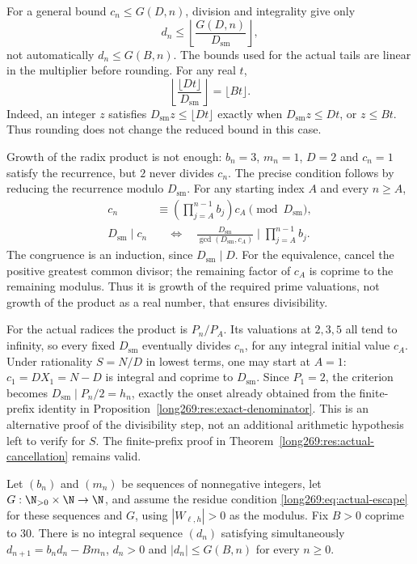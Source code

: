 For a general bound $c_n\le G(D,n)$, division and integrality give only
\[
 d_n\le\left\lfloor\frac{G(D,n)}{D_{\mathrm{sm}}}\right\rfloor,
\]
not automatically $d_n\le G(B,n)$.  The bounds used for the actual tails
are linear in the multiplier before rounding.  For any real $t$,
\[
 \left\lfloor\frac{\lfloor Dt\rfloor}{D_{\mathrm{sm}}}\right\rfloor
 =\lfloor Bt\rfloor.
\]
Indeed, an integer $z$ satisfies $D_{\mathrm{sm}}z\le\lfloor Dt\rfloor$
exactly when $D_{\mathrm{sm}}z\le Dt$, or $z\le Bt$.
Thus rounding does not change the reduced bound in this case.

Growth of the radix product is not enough: $b_n=3$, $m_n=1$, $D=2$
and $c_n=1$ satisfy the recurrence, but $2$ never divides $c_n$.
The precise condition follows by reducing the recurrence modulo
$D_{\mathrm{sm}}$.  For any starting index $A$ and every $n\ge A$,
\[
 \begin{aligned}
 c_n&\equiv\left(\prod_{j=A}^{n-1}b_j\right)c_A
       \pmod{D_{\mathrm{sm}}},\\
 D_{\mathrm{sm}}\mid c_n
 &\quad\Longleftrightarrow\quad
 \frac{D_{\mathrm{sm}}}{\gcd(D_{\mathrm{sm}},c_A)}
       \mid\prod_{j=A}^{n-1}b_j.
 \end{aligned}
\]
The congruence is an induction, since $D_{\mathrm{sm}}\mid D$.
For the equivalence, cancel the positive greatest common divisor;
the remaining factor of $c_A$ is coprime to the remaining modulus.
Thus it is growth of the required prime valuations, not growth of the
product as a real number, that ensures divisibility.

For the actual radices the product is $P_n/P_A$.  Its valuations at
$2,3,5$ all tend to infinity, so every fixed $D_{\mathrm{sm}}$ eventually
divides $c_n$, for any integral initial value $c_A$.  Under rationality
$S=N/D$ in lowest terms, one may start at $A=1$:
$c_1=DX_1=N-D$ is integral and coprime to $D_{\mathrm{sm}}$.
Since $P_1=2$, the criterion becomes
$D_{\mathrm{sm}}\mid P_n/2=h_n$, exactly the onset already obtained
from the finite-prefix identity in Proposition~\ref{long269:res:exact-denominator}.
This is an alternative proof of the divisibility step, not an additional
arithmetic hypothesis left to verify for $S$.  The finite-prefix proof
in Theorem~\ref{long269:res:actual-cancellation} remains valid.

\begin{proposition}
\label{long269:long:windowconsumer}
Let $(b_n)$ and $(m_n)$ be sequences of nonnegative integers, let
$G:\N_{>0}\times\N\to\N$, and assume the residue condition
\eqref{long269:eq:actual-escape} for these sequences and $G$, using
$|W_{\ell,h}|>0$ as the modulus.
Fix $B>0$ coprime to $30$.  There is no integral sequence $(d_n)$ satisfying
simultaneously $d_{n+1}=b_nd_n-Bm_n$, $d_n>0$ and $|d_n|\le G(B,n)$ for every
$n\ge0$.
\end{proposition}

